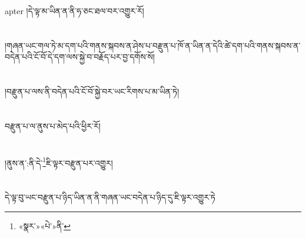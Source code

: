 apter{ }།དེ་ལྟ་མ་ཡིན་ན་ནི་ཧ་ཅང་ཐལ་བར་འགྱུར་རོ།\chapter{ }།གཞན་ཡང་གལ་ཏེ་མ་དག་པའི་གནས་སྐབས་ན་ཤེས་པ་བརྫུན་པ་ཁོ་ན་ཡིན་ན་དེའི་ཚེ་དག་པའི་གནས་སྐབས་ན་བདེན་པའི་ངོ་བོ་དེ་དག་ལས་སྐྱེ་བ་བརྗོད་པར་བྱ་དགོས་སོ།\chapter{ }།བརྫུན་པ་ལས་ནི་བདེན་པའི་ངོ་བོ་སྐྱེ་བར་ཡང་རིགས་པ་མ་ཡིན་ཏེ།\chapter{ }བརྫུན་པ་ལ་ནུས་པ་མེད་པའི་ཕྱིར་རོ།\chapter{ }།ནུས་ན་:ནི་དེ་\footnote{«སྣར་»«པེ་»ནི་}ཇི་ལྟར་བརྫུན་པར་འགྱུར།\chapter{ }དེ་ལྟ་བུ་ཡང་བརྫུན་པ་ཉིད་ཡིན་ན་ནི་གཞན་ཡང་བདེན་པ་ཉིད་དུ་ཇི་ལྟར་འགྱུར་ཏེ